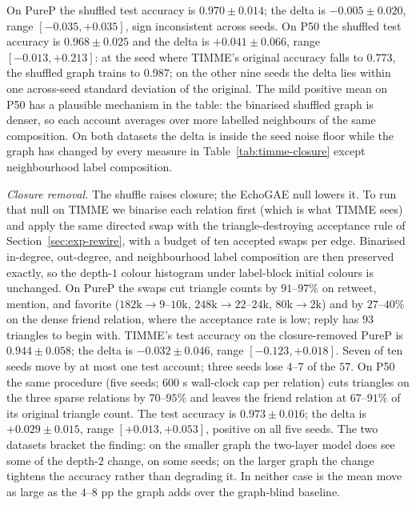 \documentclass[letterpaper]{article} %
\begin{document}
On PureP the shuffled test accuracy is $0.970 \pm 0.014$; the
delta is $-0.005 \pm 0.020$, range $[-0.035, +0.035]$, sign
inconsistent across seeds. On P50 the shuffled test accuracy
is $0.968 \pm 0.025$ and the delta is $+0.041 \pm 0.066$,
range $[-0.013, +0.213]$: at the seed where TIMME's original
accuracy falls to $0.773$, the shuffled graph trains to
$0.987$; on the other nine seeds the delta lies within one
across-seed standard deviation of the original. The mild
positive mean on P50 has a plausible mechanism in the table:
the binarised shuffled graph is denser, so each account
averages over more labelled neighbours of the same
composition. On both datasets the delta is inside the seed
noise floor while the graph has changed by every measure in
Table~\ref{tab:timme-closure} except neighbourhood label
composition.

\emph{Closure removal.} The shuffle raises closure; the
EchoGAE null lowers it. To run that null on TIMME we binarise
each relation first (which is what TIMME sees) and apply the
same directed swap with the triangle-destroying acceptance
rule of Section~\ref{sec:exp-rewire}, with a budget of ten
accepted swaps per edge. Binarised in-degree, out-degree, and
neighbourhood label composition are then preserved exactly, so
the depth-$1$ colour histogram under label-block initial
colours is unchanged. On PureP the swaps cut triangle counts
by $91$--$97\%$ on retweet, mention, and favorite
($182\mathrm{k} \to 9$--$10\mathrm{k}$, $248\mathrm{k} \to
22$--$24\mathrm{k}$, $80\mathrm{k} \to 2\mathrm{k}$) and by
$27$--$40\%$ on the dense friend relation, where the
acceptance rate is low; reply has $93$ triangles to begin
with. TIMME's test accuracy on the closure-removed PureP is
$0.944 \pm 0.058$; the delta is $-0.032 \pm 0.046$, range
$[-0.123, +0.018]$. Seven of ten seeds move by at most one
test account; three seeds lose $4$--$7$ of the $57$. On P50
the same procedure (five seeds; $600$ s wall-clock cap per
relation) cuts triangles on the three sparse relations by
$70$--$95\%$ and leaves the friend relation at
$67$--$91\%$ of its original triangle count. The test
accuracy is $0.973 \pm 0.016$; the delta is
$+0.029 \pm 0.015$, range $[+0.013, +0.053]$, positive on all
five seeds. The two datasets bracket the finding: on the
smaller graph the two-layer model does see some of the
depth-$2$ change, on some seeds; on the larger graph the
change tightens the accuracy rather than degrading it. In
neither case is the mean move as large as the $4$--$8$ pp the
graph adds over the graph-blind baseline.
\end{document}
